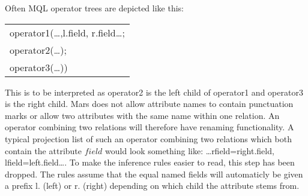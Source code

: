 Often MQL operator trees are depicted like this:
\begin{center}
\begin{tabular}{l}
\textsf{operator1(\ldots,l.field, r.field\ldots; } \\ \quad
\textsf{operator2(\ldots);} \\ \quad
\textsf{operator3(\ldots))}
\end{tabular}
\end{center}

This is to be interpreted as \textsf{operator2} is the left child of \textsf{operator1} and \textsf{operator3} is
the right child. Mars does not allow attribute names to contain punctuation marks or allow two attributes with the
same name within one relation. An operator combining two relations will therefore have renaming functionality. A
typical projection list of such an operator combining two relations which both contain the attribute $field$ would
look something like: \textsf{\ldots rfield=right.field, lfield=left.field\ldots}. To make the inference rules
easier to read, this step has been dropped. The rules assume that the equal named fields will automaticly be given
a prefix \textsf{l.} (left) or \textsf{r.} (right) depending on which child the attribute stems from.